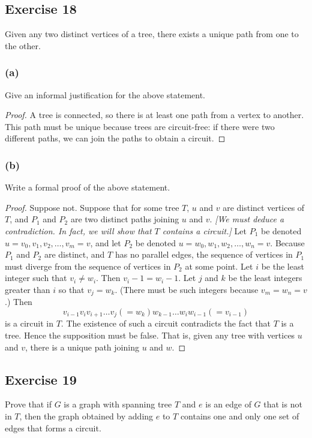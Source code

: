 \documentclass[14pt]{extarticle}
\begin{document}
\subsection{Exercise 18}
Given any two distinct vertices of a tree, there exists a unique path from one to the other.

\subsubsection{(a)}
Give an informal justification for the above statement.
\begin{proof}
    A tree is connected, so there is at least one path from a vertex to another. This path must be unique because trees are
    circuit-free: if there were two different paths, we can join the paths to obtain a circuit.
\end{proof}

\subsubsection{(b)}
Write a formal proof of the above statement.
\begin{proof}
    Suppose not. Suppose that for some tree \(T\), \(u\) and \(v\) are distinct vertices of \(T\), and \(P_1\) and \(P_2\) are
    two distinct paths joining \(u\) and \(v\). {\it [We must deduce a contradiction. In fact, we will show that \(T\)
                contains a circuit.]} Let \(P_1\) be denoted \(u = v_0, v_1, v_2, \ldots, v_m = v\), and let \(P_2\) be denoted \(u = w_0,
    w_1, w_2, \ldots, w_n = v\). Because \(P_1\) and \(P_2\) are distinct, and \(T\) has no parallel edges, the sequence of
    vertices in \(P_1\) must diverge from the sequence of vertices in \(P_2\) at some point. Let \(i\) be the least integer such
    that \(v_i \neq w_i\). Then \(v_i - 1 = w_i - 1\). Let \(j\) and \(k\) be the least integers greater than \(i\) so that
    \(v_j = w_k\). (There must be such integers because \(v_m = w_n = v\).) Then
    \[
        v_{i - 1}v_iv_{i+1} \ldots v_j(= w_k) w_{k - 1} \ldots w_iw_{i - 1} (= v_{i-1})
    \]
    is a circuit in \(T\). The existence of such a circuit contradicts the fact that \(T\) is a tree. Hence the
    supposition must be false. That is, given any tree with vertices \(u\) and \(v\), there is a unique path joining
    \(u\) and \(w\).
\end{proof}

\subsection{Exercise 19}
Prove that if \(G\) is a graph with spanning tree \(T\) and \(e\) is an edge of \(G\) that is not in \(T\), then the graph
obtained by adding \(e\) to \(T\) contains one and only one set of edges that forms a circuit.
\end{document}
